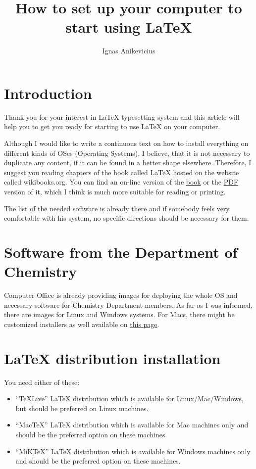 \documentclass[a4paper]{article}
\title{How to set up your computer to start using \LaTeX{}}
\author{Ignas Anikevicius}
\newcommand{\MiKTeX}{MiK\TeX}
\newcommand{\MacTeX}{Mac\TeX}
\newcommand{\TeXLive}{\TeX Live}
\begin{document}
\maketitle

\section{Introduction}

Thank you for your interest in \LaTeX{} typesetting system and this article
will help you to get you ready for starting to use \LaTeX{} on your
computer.

Although I would like to write a continuous text on how to install
everything on different kinds of OSes (Operating Systems), I believe, that it
is not necessary to duplicate any content, if it can be found in a better
shape elsewhere. Therefore, I suggest you reading chapters of the book called
\LaTeX{} hosted on the website called wikibooks.org. You can find an on-line
version of the
\href{https://secure.wikimedia.org/wikibooks/en/wiki/LaTeX}{book} or the
\href{http://upload.wikimedia.org/wikipedia/commons/2/2d/LaTeX.pdf}{PDF}
version of it, which I think is much more suitable for reading or printing.

The list of the needed software is already there and if somebody feels very
comfortable with his system, no specific directions should be necessary for
them.

\section{Software from the Department of Chemistry}

Computer Office is already providing images for deploying the whole OS and
necessary software for Chemistry Department members. As far as I was informed,
there are images for Linux and Windows systems. For Macs, there might be
customized installers as well available on \href{http://www.google.co.uk}{this
page}.

\section{\LaTeX{} distribution installation}

You need either of these:
\begin{itemize}
    \item ``\TeXLive'' \LaTeX{} distribution which is available for
        Linux/Mac/Windows, but should be preferred on Linux machines.
    \item ``\MacTeX{}'' \LaTeX{} distribution which is available for Mac machines
        only and should be the preferred option on these machines.
    \item ``\MiKTeX{}'' \LaTeX{} distribution which is available for Windows machines
        only and should be the preferred option on these machines.
\end{itemize}
\end{document}
